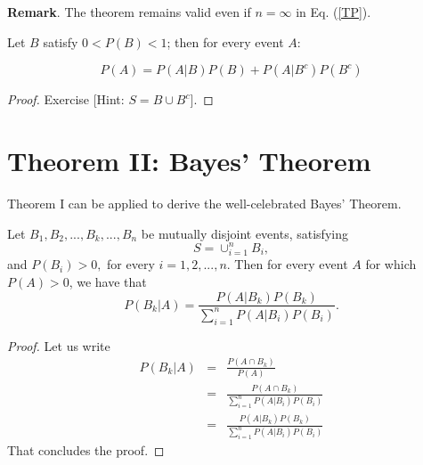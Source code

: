 \documentclass[notes=show, handout]{beamer}\usepackage[]{graphicx}\usepackage[]{color}
\newcommand{\bea}{\begin{eqnarray}}
\newcommand{\eea}{\end{eqnarray}}
\newcommand{\nn}{\nonumber}
\begin{document}
\begin{frame}{\secname}
  \textbf{Remark}. The theorem remains valid even if $n=\infty$ in Eq. (\ref{TP}). %
  \begin{corollary}
  Let $B$ satisfy $0<P(B)<1$; then for every event $A$:

  \begin{equation*}
  P(A)=P(A\vert B)P(B)+P(A\vert B^c) P(B^c)
  \end{equation*}

  \end{corollary}

  \begin{proof}
  Exercise [Hint: $S=B \cup B^c$].
  \end{proof}
\end{frame}


\section{Theorem II: Bayes' Theorem}


\begin{frame}{\secname}
  Theorem I can be applied to derive the well-celebrated Bayes' Theorem.
  \begin{theorem} 
  \label{Th:Bayes}
  Let $B_1,B_2,...,B_k,...,B_n$ be mutually disjoint events, satisfying
  $$S=\cup_{i=1}^{n} B_i,$$ and $P(B_i)>0,$
  for every $i=1,2,...,n$. Then for every event $A$ for which $P(A)>0$, we have that
  \begin{equation}
  \label{Bayes}
  P(B_k\vert A)=\frac{P(A\vert B_k)P(B_k)}{\sum_{i=1}^n P(A\vert B_i) P(B_i)}.
  \end{equation}
  \end{theorem}
\end{frame}

\begin{frame}{\secname}
  \begin{proof}
  Let us write
  \bea
  P(B_k\vert A)&=&\frac{P(A\cap B_k)}{P(A)} \nn \\
  &=&\frac{P(A\cap B_k)}{\sum_{i=1}^n P(A\vert B_i) P(B_i)}\nn \\
  &=&\frac{P(A\vert B_k)P(B_k)}{\sum_{i=1}^n P(A\vert B_i) P(B_i)} \nn
  \eea
  That concludes the proof.
  \end{proof}
\end{frame}
\end{document}
